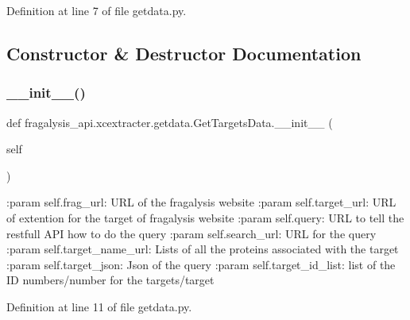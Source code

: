 Definition at line 7 of file getdata.\+py.



\subsection{Constructor \& Destructor Documentation}
\mbox{\label{classfragalysis__api_1_1xcextracter_1_1getdata_1_1_get_targets_data_a40260f1d84f75c354f8b1b7124732b3a}} 
\subsubsection{\texorpdfstring{\+\_\+\+\_\+init\+\_\+\+\_\+()}{\_\_init\_\_()}}
{\footnotesize\ttfamily def fragalysis\+\_\+api.\+xcextracter.\+getdata.\+Get\+Targets\+Data.\+\_\+\+\_\+init\+\_\+\+\_\+ (\begin{DoxyParamCaption}\item[{}]{self }\end{DoxyParamCaption})}

\begin{DoxyVerb}:param self.frag_url: URL of the fragalysis website
:param self.target_url: URL of extention for the target of fragalysis website
:param self.query: URL to tell the restfull API how to do the query
:param self.search_url: URL for the query 
:param self.target_name_url: Lists of all the proteins associated with the target
:param self.target_json: Json of the query
:param self.target_id_list: list of the ID numbers/number for the targets/target
\end{DoxyVerb}
 

Definition at line 11 of file getdata.\+py.


